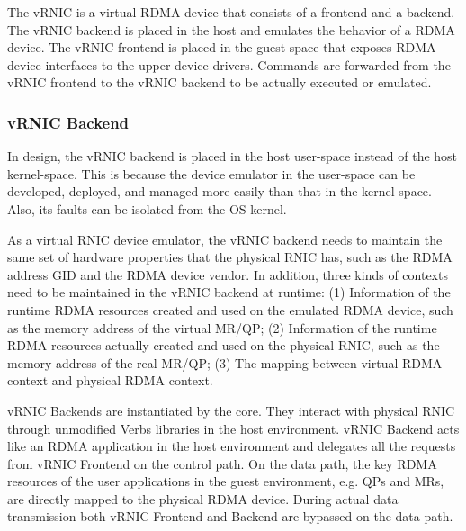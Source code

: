 
The vRNIC is a virtual RDMA device that consists of a frontend and a backend. The vRNIC backend is placed in the host and emulates the behavior of a RDMA device. The vRNIC frontend is placed in the guest space that exposes RDMA device interfaces to the upper device drivers. Commands are forwarded from the vRNIC frontend to the vRNIC backend to be actually executed or emulated.

\subsubsection{vRNIC Backend}


In \sys design, the vRNIC backend is placed in the host user-space instead of the host kernel-space. This is because the device emulator in the user-space can be developed, deployed, and managed more easily than that in the kernel-space. Also, its faults can be isolated from the OS kernel.


As a virtual RNIC device emulator, the vRNIC backend needs to maintain the same set of hardware properties that the physical RNIC has, such as the RDMA address GID and the RDMA device vendor. In addition, three kinds of contexts need to be maintained in the vRNIC backend at runtime:
(1) Information of the runtime RDMA resources created and used on the emulated RDMA device, such as the memory address of the virtual MR/QP;
(2) Information of the runtime RDMA resources actually created and used on the physical RNIC, such as the memory address of the real MR/QP;
(3) The mapping between virtual RDMA context and physical RDMA context.

vRNIC Backends are instantiated by the \sys core. They interact with physical RNIC through unmodified Verbs libraries in the host environment. vRNIC Backend acts like an RDMA application in the host environment and delegates all the requests from vRNIC Frontend on the control path. On the data path, the key RDMA resources of the user applications in the guest environment, e.g. QPs and MRs, are directly mapped to the physical RDMA device. During actual data transmission both vRNIC Frontend and Backend are bypassed on the data path.

